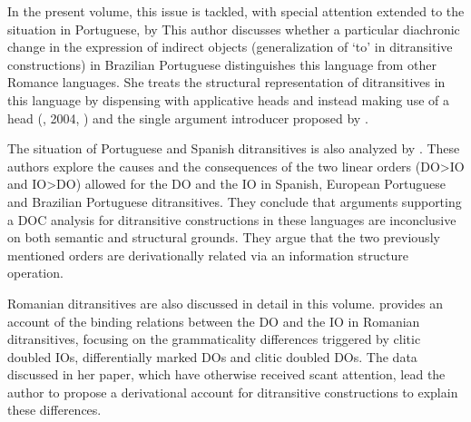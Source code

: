\documentclass[output=paper,modfonts,nonflat]{langsci/langscibook}
\begin{document}
\begin{styleListNumberi}
In the present volume, this issue is tackled, with special attention extended to the situation in Portuguese, by This author discusses whether a particular diachronic change in the expression of indirect objects (generalization of ‘to’ in ditransitive constructions) in Brazilian Portuguese distinguishes this language from other Romance languages. She treats the structural representation of ditransitives in this language by dispensing with applicative heads and instead making use of a  head (\citealt{Svenonius2003}, 2004, \citealt{Wood2012}) and the  single argument introducer proposed by \citet{WoodMarantz2017}. 
\end{styleListNumberi}

\begin{styleListNumberi}
The situation of Portuguese and Spanish ditransitives is also analyzed by . These authors explore the causes and the consequences of the two linear orders (DO>IO and IO>DO) allowed for the DO and the IO in Spanish, European Portuguese and Brazilian Portuguese ditransitives. They conclude that arguments supporting a DOC analysis for ditransitive constructions in these languages are inconclusive on both semantic and structural grounds. They argue that the two previously mentioned orders are derivationally related via an information structure operation.
\end{styleListNumberi}

\begin{styleListNumberi}
Romanian ditransitives are also discussed in detail in this volume. provides an account of the binding relations between the DO and the IO in Romanian ditransitives, focusing on the grammaticality differences triggered by clitic doubled IOs, differentially marked DOs and clitic doubled DOs. The data discussed in her paper, which have otherwise received scant attention, lead the author to propose a derivational account for ditransitive constructions to explain these differences.
\end{styleListNumberi}
\end{document}
